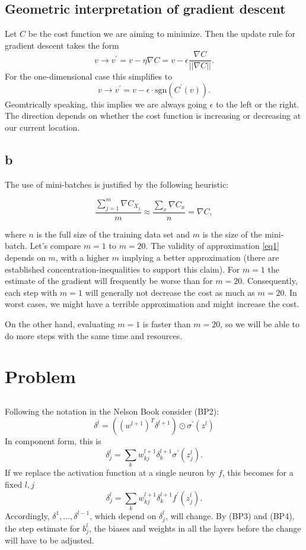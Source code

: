 \documentclass{article}
\begin{document}
\section{}
\subsection{Geometric interpretation of gradient descent}

Let $C$ be the cost function we are aiming to minimize. Then the update rule for gradient descent takes the form 
$$
v \rightarrow v^{\prime}=v-\eta \nabla C=v-\epsilon  \frac{\nabla C}{||\nabla C||}.
$$  
For the one-dimensional case this simplifies to 
$$
v \rightarrow v^{\prime}=v-\epsilon \cdot   \mathrm{sgn}(C^{\prime}(v)).
$$  
Geomtrically speaking, this implies we are always going $\epsilon$ to the left or the right. The direction depends on whether the cost function is increasing or decreasing at our current location.  

\subsection{b}

The use of mini-batches is justified by the following heuristic:

\begin{equation}
\label{eq1}
\frac{\sum_{j=1}^m \nabla C_{X_j}}{m} \approx \frac{\sum_x \nabla C_x}{n}=\nabla C,	
\end{equation}

where $n$ is the full size of the training data set and $m$ is the size of the mini-batch. Let's compare $m=1$ to $m=20$. The validity of approximation \eqref{eq1} depends on $m$, with a higher $m$ implying a better approximation (there are established concentration-inequalities to support this claim). For $m=1$ the estimate of the gradient will frequently be worse than for $m=20$. Consequently, 
	each step with $m=1$ will generally not decrease the cost as much as $m=20$. In worst cases, we might have a terrible approximation and might increase the cost. 
	
	On the other hand, evaluating $m=1$ is faster than $m=20$, so we will be able to do more steps with the same time and resources.
\section{Problem}
\subsection{}
Following the notation in the Nelson Book consider (BP2):
$$
\delta^l=\left(\left(w^{l+1}\right)^T \delta^{l+1}\right) \odot \sigma^{\prime}\left(z^l\right)
$$
In component form, this is 
$$
\delta_j^l=\sum_k w_{k j}^{l+1} \delta_k^{l+1} \sigma^{\prime}\left(z_j^l\right).
$$
If we replace the activation function at a single neuron by $f$, this becomes for a fixed $l,j$
$$
\delta_j^l=\sum_k w_{k j}^{l+1} \delta_k^{l+1} f^{\prime}\left(z_j^l\right).
$$
Accordingly, $\delta^{1},\ldots , \delta^{l-1}$, which depend on $\delta_j^l$, will change. By (BP3) and (BP4), the step estimate for $b_j^l$, the biases and weights in all the layers before the change will have to be adjusted.
\end{document}

